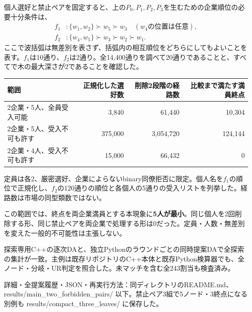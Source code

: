 \documentclass[a4paper,10pt]{ltjsarticle}
\newcommand{\set}[1]{\{#1\}}
\newcommand{\hd}[1]{\vspace{5pt}{\large\bfseries #1}\par}
\begin{document}
\hd{順位の本質：20通りの企業選好で同じ現象が起こる}
個人選好と禁止ペアを固定すると、上の$P_0,P_1,P_2,P_3$を生むための企業順位の必要十分条件は、
\begin{align*}
 f_1 &: \set{w_1,w_2}\succ w_5\succ w_3\quad (w_4\text{の位置は任意}),\\
 f_2 &: \set{w_4,w_5}\succ w_3\succ w_2\succ w_1.
\end{align*}
ここで波括弧は無差別を表さず、括弧内の相互順位をどちらにしてもよいことを表す。$f_1$は10通り、$f_2$は2通り。全14,400通りを調べて20通りであることと、すべてで木の最大深さが2であることを確認した。

\hd{全探索の範囲}
\begin{center}
\begin{tabular}{lrrr}
\toprule
範囲 & 正規化した選好数 & 削除2段階の経路数 & 比較まで満たす満員終点\\
\midrule
2企業・5人、全員受入可能 & 3,840 & 61,440 & 10,304\\
2企業・5人、受入不可も許す & 375,000 & 3,054,720 & 124,144\\
2企業・4人、受入不可も許す & 15,000 & 66,432 & 0\\
\bottomrule
\end{tabular}
\end{center}
定員は各2、厳密選好、企業によらないbinary同僚拒否に限定。個人名を$f_1$の順位で正規化し、$f_2$の120通りの順位と各個人の5通りの受入リストを列挙した。経路数は市場の同型類数ではない。

この範囲では、終点を両企業満員とする本現象に\textbf{5人が最小}。同じ個人を2回削除する形、同じ禁止ペアを両企業で処理する形は0だった。定員・人数・無差別を変えた一般的不可能性は主張しない。

\hd{独立検算と再現データ}
探索専用C++の逐次DAと、独立Pythonのラウンドごとの同時提案DAで全探索の集計が一致。主例は既存リポジトリのC++本体と既存Python検算器でも、全ノード・分岐・UR判定を照合した。未マッチを含む全243割当も検査済み。

\small 詳細・全提案履歴・JSON・再実行方法：同ディレクトリのREADME.md、results/main\_two\_forbidden\_pairs/ 以下。禁止ペア3組で5ノード・3終点になる別例も results/compact\_three\_leaves/ に保存した。
\end{document}
